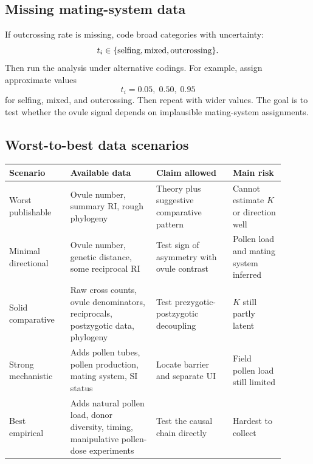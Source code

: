 \documentclass[12pt]{article}
\begin{document}
\subsection{Missing mating-system data}

If outcrossing rate is missing, code broad categories with uncertainty:
\begin{equation}
t_i\in\{\hbox{selfing},\hbox{mixed},\hbox{outcrossing}\}.
\end{equation}
Then run the analysis under alternative codings. For example, assign approximate values
\begin{equation}
t_i=0.05,\;0.50,\;0.95
\end{equation}
for selfing, mixed, and outcrossing. Then repeat with wider values. The goal is to test whether the ovule signal depends on implausible mating-system assignments.

\subsection{Worst-to-best data scenarios}

\begin{center}
\begin{tabular}{>{\raggedright\arraybackslash}p{0.20\linewidth} >{\raggedright\arraybackslash}p{0.28\linewidth} >{\raggedright\arraybackslash}p{0.25\linewidth} >{\raggedright\arraybackslash}p{0.17\linewidth}}
\toprule
Scenario & Available data & Claim allowed & Main risk \\
\midrule
Worst publishable & Ovule number, summary RI, rough phylogeny & Theory plus suggestive comparative pattern & Cannot estimate $K$ or direction well \\
Minimal directional & Ovule number, genetic distance, some reciprocal RI & Test sign of asymmetry with ovule contrast & Pollen load and mating system inferred \\
Solid comparative & Raw cross counts, ovule denominators, reciprocals, postzygotic data, phylogeny & Test prezygotic-postzygotic decoupling & $K$ still partly latent \\
Strong mechanistic & Adds pollen tubes, pollen production, mating system, SI status & Locate barrier and separate UI & Field pollen load still limited \\
Best empirical & Adds natural pollen load, donor diversity, timing, manipulative pollen-dose experiments & Test the causal chain directly & Hardest to collect \\
\bottomrule
\end{tabular}
\end{center}
\end{document}
